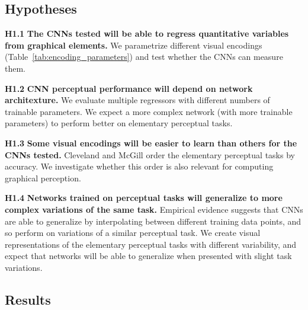 %
\subsection{Hypotheses}

\begin{hypolist}
\item \textbf{H1.1} \textbf{The CNNs tested will be able to regress quantitative variables from graphical elements.} We parametrize different visual encodings (Table~\ref{tab:encoding_parameters}) and test whether the CNNs can measure them. %

\item \textbf{H1.2} \textbf{CNN perceptual performance will depend on network architexture.} We evaluate multiple regressors with different numbers of trainable parameters. We expect a more complex network (with more trainable parameters) to perform better on elementary perceptual tasks.

\item \textbf{H1.3} \textbf{Some visual encodings will be easier to learn than others for the CNNs tested.} Cleveland and McGill order the elementary perceptual tasks by accuracy. We investigate whether this order is also relevant for computing graphical perception.

\item \textbf{H1.4} \textbf{Networks trained on perceptual tasks will generalize to more complex variations of the same task.} Empirical evidence suggests that CNNs are able to generalize by interpolating between different training data points, and so perform on variations of a similar perceptual task. We create visual representations of the elementary perceptual tasks with different variability, and expect that networks will be able to generalize when presented with slight task variations.
\end{hypolist}

%	
%	


\subsection{Results}

